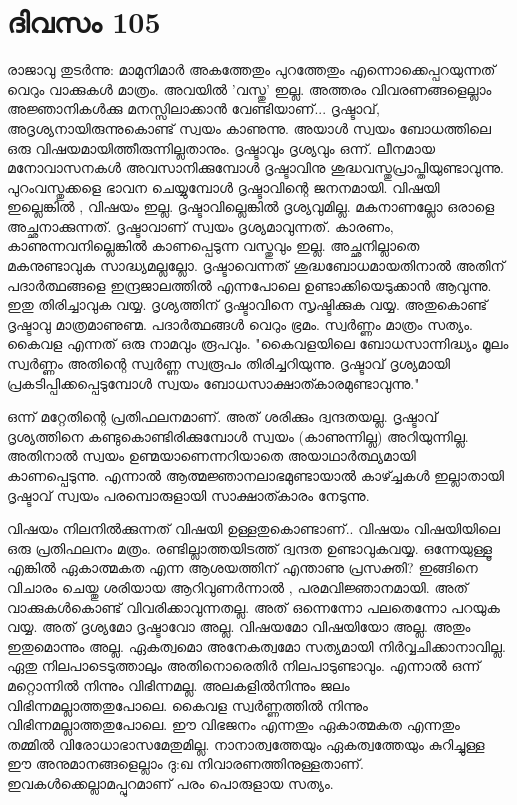 \newpage
\section{ദിവസം 105}


രാജാവു തുടര്‍ന്നു: മാമുനിമാര്‍ അകത്തേതും പുറത്തേതും എന്നൊക്കെപ്പറയുന്നത്‌ വെറും വാക്കുകള്‍ മാത്രം. അവയില്‍ 'വസ്തു' ഇല്ല. അത്തരം വിവരണങ്ങളെല്ലാം അജ്ഞാനികള്‍ക്കു മനസ്സിലാക്കാന്‍ വേണ്ടിയാണ്‌... ദൃഷ്ടാവ്‌, അദൃശ്യനായിരുന്നുകൊണ്ട്‌ സ്വയം കാണുന്നു. അയാള്‍ സ്വയം ബോധത്തിലെ ഒരു വിഷയമായിത്തീരുന്നില്ലതാനും. ദൃഷ്ടാവും ദൃശ്യവും ഒന്ന്. ലീനമായ മനോവാസനകള്‍ അവസാനിക്കുമ്പോള്‍ ദൃഷ്ടാവിനു ശുദ്ധവസ്തുപ്രാപ്തിയുണ്ടാവുന്നു. പുറംവസ്തുക്കളെ ഭാവന ചെയ്യുമ്പോള്‍ ദൃഷ്ടാവിന്റെ ജനനമായി. വിഷയി ഇല്ലെങ്കില്‍ , വിഷയം ഇല്ല. ദൃഷ്ടാവില്ലെങ്കില്‍ ദൃശ്യവുമില്ല. മകനാണല്ലോ ഒരാളെ അച്ഛനാക്കുന്നത്‌. ദൃഷ്ടാവാണ്‌ സ്വയം ദൃശ്യമാവുന്നത്‌. കാരണം, കാണുന്നവനില്ലെങ്കില്‍ കാണപ്പെടുന്ന വസ്തുവും ഇല്ല. അച്ഛനില്ലാതെ മകനുണ്ടാവുക സാദ്ധ്യമല്ലല്ലോ. ദൃഷ്ടാവെന്നത്‌ ശുദ്ധബോധമായതിനാല്‍ അതിന്‌ പദാര്‍ത്ഥങ്ങളെ ഇന്ദ്രജാലത്തില്‍ എന്നപോലെ ഉണ്ടാക്കിയെടുക്കാന്‍ ആവുന്നു. ഇതു തിരിച്ചാവുക വയ്യ. ദൃശ്യത്തിന്‌ ദൃഷ്ടാവിനെ സൃഷ്ടിക്കുക വയ്യ. അതുകൊണ്ട്‌ ദൃഷ്ടാവു മാത്രമാണുണ്മ. പദാര്‍ത്ഥങ്ങള്‍ വെറും ഭ്രമം. സ്വര്‍ണ്ണം മാത്രം സത്യം. കൈവള എന്നത്‌ ഒരു നാമവും രൂപവും. "കൈവളയിലെ ബോധസാന്നിദ്ധ്യം മൂലം സ്വര്‍ണ്ണം അതിന്റെ സ്വര്‍ണ്ണ സ്വരൂപം തിരിച്ചറിയുന്നു. ദൃഷ്ടാവ്‌ ദൃശ്യമായി പ്രകടിപ്പിക്കപ്പെടുമ്പോള്‍ സ്വയം ബോധസാക്ഷാത്കാരമുണ്ടാവുന്നു."

ഒന്ന് മറ്റേതിന്റെ പ്രതിഫലനമാണ്‌. അത്‌ ശരിക്കും ദ്വന്ദതയല്ല. ദൃഷ്ടാവ്‌ ദൃശ്യത്തിനെ കണ്ടുകൊണ്ടിരിക്കുമ്പോള്‍ സ്വയം (കാണുന്നില്ല) അറിയുന്നില്ല. അതിനാല്‍ സ്വയം ഉണ്മയാണെന്നറിയാതെ അയാഥാര്‍ത്ഥ്യമായി കാണപ്പെടുന്നു. എന്നാല്‍ ആത്മജ്ഞാനലാഭമുണ്ടായാല്‍ കാഴ്ച്ചകള്‍ ഇല്ലാതായി ദൃഷ്ടാവ്‌ സ്വയം പരമ്പൊരുളായി സാക്ഷാത്കാരം നേടുന്നു.

വിഷയം നിലനില്‍ക്കുന്നത്‌ വിഷയി ഉള്ളതുകൊണ്ടാണ്‌.. വിഷയം വിഷയിയിലെ ഒരു പ്രതിഫലനം മത്രം. രണ്ടില്ലാത്തയിടത്ത്‌ ദ്വന്ദത ഉണ്ടാവുകവയ്യ. ഒന്നേയുള്ളൂ എങ്കില്‍ ഏകാത്മകത എന്ന ആശയത്തിന്‌ എന്താണു പ്രസക്തി? ഇങ്ങിനെ വിചാരം ചെയ്തു ശരിയായ ആറിവുണര്‍ന്നാല്‍ , പരമവിജ്ഞാനമായി. അത്‌ വാക്കുകള്‍കൊണ്ട്‌ വിവരിക്കാവുന്നതല്ല. അത്‌ ഒന്നെന്നോ പലതെന്നോ പറയുക വയ്യ. അത്‌ ദൃശ്യമോ ദൃഷ്ടാവോ അല്ല. വിഷയമോ വിഷയിയോ അല്ല. അതും ഇതുമൊന്നും അല്ല. ഏകത്വമൊ അനേകത്വമോ സത്യമായി നിര്‍വ്വചിക്കാനാവില്ല. ഏതു നിലപാടെടുത്താലും അതിനൊരെതിര്‍ നിലപാടുണ്ടാവും. എന്നാല്‍ ഒന്ന് മറ്റൊന്നില്‍ നിന്നും വിഭിന്നമല്ല. അലകളില്‍നിന്നും ജലം വിഭിന്നമല്ലാത്തതുപോലെ. കൈവള സ്വര്‍ണ്ണത്തില്‍ നിന്നും വിഭിന്നമല്ലാത്തതുപോലെ. ഈ വിഭജനം എന്നതും ഏകാത്മകത എന്നതും തമ്മില്‍ വിരോധാഭാസമേതുമില്ല. നാനാത്വത്തേയും ഏകത്വത്തേയും കുറിച്ചുള്ള ഈ അനുമാനങ്ങളെല്ലാം ദു:ഖ നിവാരണത്തിനുള്ളതാണ്‌. ഇവകള്‍ക്കെല്ലാമപ്പുറമാണ്‌ പരം പൊരുളായ സത്യം.

